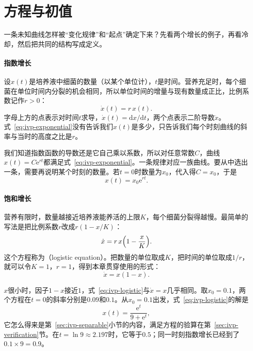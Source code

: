 \section{方程与初值}
\label{sec:ivp-equations}

一条未知曲线怎样被“变化规律”和“起点”确定下来？先看两个增长的例子，再看冷却，然后把共同的结构写成定义。

\paragraph{指数增长}
设$x(t)$是培养液中细菌的数量（以某个单位计），$t$是时间。营养充足时，每个细菌在单位时间内分裂的机会相同，所以单位时间的增量与现有数量成正比，比例系数记作$r>0$：
\begin{equation}
 \dot{x}(t)=r\,x(t).
 \label{eq:ivp-exponential}
\end{equation}
字母上方的点表示对时间$t$求导，$\dot{x}(t)=\mathrm{d}x/\mathrm{d}t$，两个点表示二阶导数$\ddot{x}$。式~\eqref{eq:ivp-exponential}没有告诉我们$x(t)$是多少，只告诉我们每个时刻曲线的斜率与当时的高度之比是$r$。

我们知道指数函数的导数还是它自己乘以系数，所以对任意常数$C$，曲线$x(t)=C\mathrm{e}^{rt}$都满足式~\eqref{eq:ivp-exponential}。一条规律对应一族曲线。要从中选出一条，需要再说明某个时刻的数量。若$t=0$时数量为$x_0$，代入得$C=x_0$，于是
\begin{equation}
 x(t)=x_0\mathrm{e}^{rt}.
 \label{eq:ivp-exponential-solution}
\end{equation}

\paragraph{饱和增长}
营养有限时，数量越接近培养液能养活的上限$K$，每个细菌分裂得越慢。最简单的写法是把比例系数$r$改成$r(1-x/K)$：
\begin{equation}
 \dot{x}=r\,x\Bigl(1-\frac{x}{K}\Bigr).
 \label{eq:ivp-logistic-general}
\end{equation}
这个方程称为（logistic equation）。把数量的单位取成$K$，把时间的单位取成$1/r$，就可以令$K=1$，$r=1$，得到本章贯穿使用的形式：
\begin{equation}
 \dot{x}=x(1-x).
 \label{eq:ivp-logistic}
\end{equation}

$x$很小时，因子$1-x$接近$1$，式~\eqref{eq:ivp-logistic}与$\dot{x}=x$几乎相同。取$x_0=0.1$，两个方程在$t=0$的斜率分别是$0.09$和$0.1$。从$x_0=0.1$出发，式~\eqref{eq:ivp-logistic}的解是
\begin{equation}
 x(t)=\frac{\mathrm{e}^{t}}{9+\mathrm{e}^{t}},
 \label{eq:ivp-logistic-solution}
\end{equation}
它怎么得来是第~\ref{sec:ivp-separable}小节的内容，满足方程的验算在第~\ref{sec:ivp-verification}节。在$t=\ln 9\approx 2.197$时，它等于$0.5$；同一时刻指数增长已经到了$0.1\times 9=0.9$。

